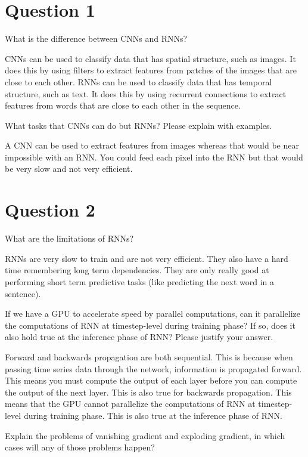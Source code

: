 \documentclass{article}
\begin{document}
\section{Question 1}

What is the difference between CNNs and RNNs?

CNNs can be used to classify data that has spatial structure, such as images. It does this by using filters to extract features from patches of the images that are close to each other. RNNs can be used to classify data that has temporal structure, such as text. It does this by using recurrent connections to extract features from words that are close to each other in the sequence.


What tasks that CNNs can do but RNNs? Please explain with examples.

A CNN can be used to extract features from images whereas that would be near impossible with an RNN. You could feed each pixel into the RNN but that would be very slow and not very efficient.



\section{Question 2}

What are the limitations of RNNs?

RNNs are very slow to train and are not very efficient. They also have a hard time remembering long term dependencies. They are only really good at performing short term predictive tasks (like predicting the next word in a sentence).

If we have a GPU to accelerate speed by parallel computations, can it parallelize the computations of RNN at timestep-level during training phase? If so, does it also hold true at the inference phase of RNN?  Please justify your answer.

Forward and backwards propagation are both sequential. This is because when passing time series data through the network, information is propagated forward. This means you must compute the output of each layer before you can compute the output of the next layer. This is also true for backwards propagation. This means that the GPU cannot parallelize the computations of RNN at timestep-level during training phase. This is also true at the inference phase of RNN.


Explain the problems of vanishing gradient and exploding gradient, in which cases will any of those problems happen?
\end{document}

